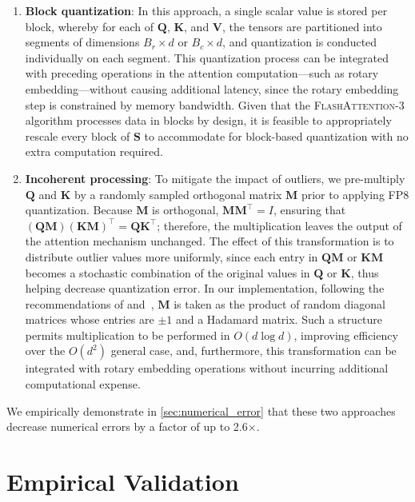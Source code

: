 \begin{enumerate}

\item \textbf{Block quantization}: In this approach, a single scalar value is stored per block, whereby for each of $\mathbf{Q}$, $\mathbf{K}$, and $\mathbf{V}$, the tensors are partitioned into segments of dimensions $B_r \times d$ or $B_c \times d$, and quantization is conducted individually on each segment. This quantization process can be integrated with preceding operations in the attention computation—such as rotary embedding—without causing additional latency, since the rotary embedding step is constrained by memory bandwidth. Given that the \textsc{FlashAttention-3} algorithm processes data in blocks by design, it is feasible to appropriately rescale every block of $\mathbf{S}$ to accommodate for block-based quantization with no extra computation required.

\item \textbf{Incoherent processing}: To mitigate the impact of outliers, we pre-multiply $\mathbf{Q}$ and $\mathbf{K}$ by a randomly sampled orthogonal matrix $\mathbf{M}$ prior to applying FP8 quantization. Because $\mathbf{M}$ is orthogonal, $\mathbf{M} \mathbf{M}^\top = I$, ensuring that $(\mathbf{Q} \mathbf{M})(\mathbf{K} \mathbf{M})^\top = \mathbf{Q} \mathbf{K}^\top$; therefore, the multiplication leaves the output of the attention mechanism unchanged. The effect of this transformation is to distribute outlier values more uniformly, since each entry in $\mathbf{Q} \mathbf{M}$ or $\mathbf{K} \mathbf{M}$ becomes a stochastic combination of the original values in $\mathbf{Q}$ or $\mathbf{K}$, thus helping decrease quantization error. In our implementation, following the recommendations of \citet{chee2024quip} and~\citet{tseng2024quip}, $\mathbf{M}$ is taken as the product of random diagonal matrices whose entries are $\pm 1$ and a Hadamard matrix. Such a structure permits multiplication to be performed in $O(d \log d)$, improving efficiency over the $O(d^2)$ general case, and, furthermore, this transformation can be integrated with rotary embedding operations without incurring additional computational expense.
\end{enumerate}

We empirically demonstrate in \cref{sec:numerical_error} that these two approaches decrease numerical errors by a factor of up to 2.6$\times$.

\section{Empirical Validation}
\label{sec:exp}

